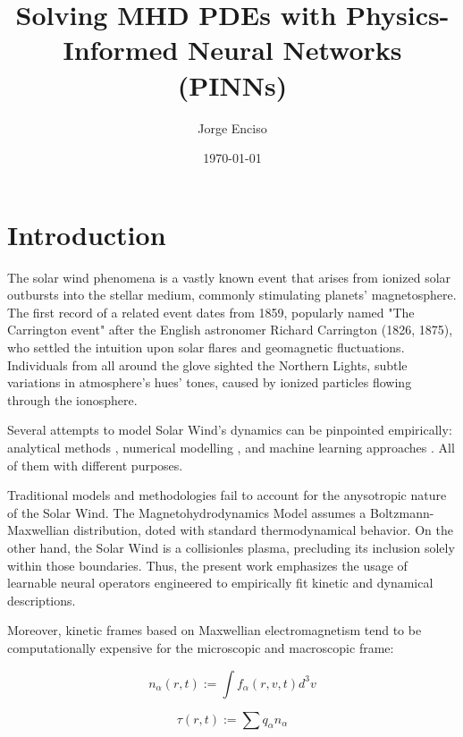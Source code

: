 \documentclass[12pt]{article}
\title{Solving MHD PDEs with Physics-Informed Neural Networks (PINNs)}
\author{Jorge Enciso}
\date{\today}
\begin{document}
\maketitle

\begin{abstract}
\end{abstract}

\tableofcontents
\newpage

\section{Introduction}

The solar wind phenomena is a vastly known event that arises from ionized solar outbursts into the stellar medium, commonly stimulating planets' magnetosphere. \cite{Gosling2007} The first record of a related event dates from 1859, popularly named "The Carrington event" after the English astronomer Richard Carrington (1826, 1875), who settled the intuition upon solar flares and geomagnetic fluctuations. Individuals from all around the glove sighted the Northern Lights, subtle variations in atmosphere's hues' tones, caused by ionized particles flowing through the ionosphere.

Several attempts to model Solar Wind's dynamics can be pinpointed empirically: analytical methods \cite{}, numerical modelling \cite{2006LNCS.3732..554E, 10.3389/fspas.2023.1105797,10.1093/mnras/staa3533}, and machine learning approaches \cite{comp_1, comp_2, comp_3}. All of them with different purposes.

Traditional models and methodologies fail to account for the anysotropic nature of the Solar Wind. The Magnetohydrodynamics Model assumes a Boltzmann-Maxwellian distribution, doted with standard thermodynamical behavior. On the other hand, the Solar Wind is a collisionles plasma, precluding its inclusion solely within those boundaries. Thus, the present work emphasizes the usage of learnable neural operators engineered to empirically fit kinetic and dynamical descriptions.

Moreover, kinetic frames based on Maxwellian electromagnetism tend to be computationally expensive for the microscopic and macroscopic frame:

\begin{equation}
    n_{\alpha} (r, t) := \int f_{\alpha}(r, v, t) d^3v
\end{equation}

\begin{equation}
    \tau(r, t) := \sum q_{\alpha} n_{\alpha}
\end{equation}
\end{document}
